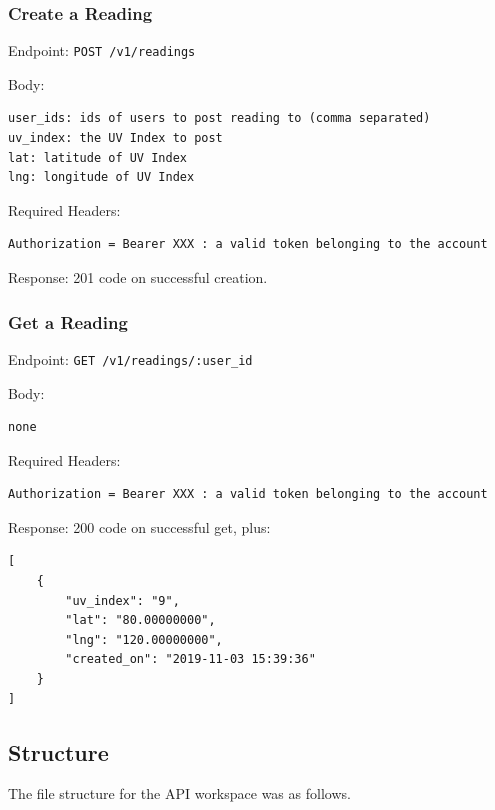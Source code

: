 \documentclass[12pt,openany,a4paper]{book}
\begin{document}
\subsubsection{Create a Reading}

Endpoint: \verb|POST /v1/readings|

Body:

\begin{verbatim}
user_ids: ids of users to post reading to (comma separated)
uv_index: the UV Index to post
lat: latitude of UV Index
lng: longitude of UV Index
\end{verbatim}

Required Headers: 

\begin{verbatim}
Authorization = Bearer XXX : a valid token belonging to the account
\end{verbatim}

Response: 201 code on successful creation.

\subsubsection{Get a Reading}

Endpoint: \verb|GET /v1/readings/:user_id|

Body:

\begin{verbatim}
none
\end{verbatim}

Required Headers: 

\begin{verbatim}
Authorization = Bearer XXX : a valid token belonging to the account
\end{verbatim}

Response: 200 code on successful get, plus:
\begin{verbatim}
[
	{
		"uv_index": "9",
		"lat": "80.00000000",
		"lng": "120.00000000",
		"created_on": "2019-11-03 15:39:36"
	}
]
\end{verbatim}

\subsection{Structure}
\label{secn:structure}

The file structure for the API workspace was as follows.

\end{document}
